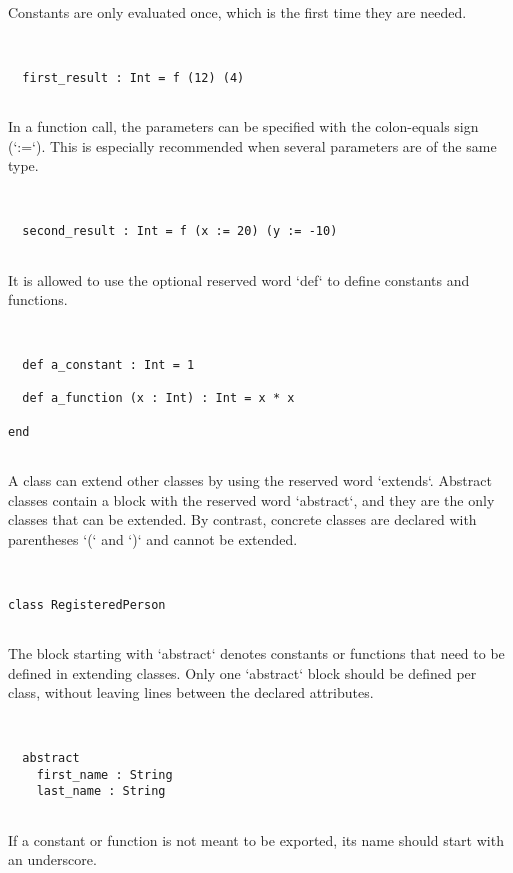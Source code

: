 \documentclass[12pt,a4paper]{article}
\begin{document}
  Constants are only evaluated once, which is the first time they are needed.


\begin{lstlisting}


  first_result : Int = f (12) (4)


\end{lstlisting}

  In a function call, the parameters can be specified with the colon-equals sign (`:=`).
   This is especially recommended when several parameters are of the same type.


\begin{lstlisting}


  second_result : Int = f (x := 20) (y := -10)


\end{lstlisting}

  It is allowed to use the optional reserved word `def` to define constants and functions.


\begin{lstlisting}


  def a_constant : Int = 1

  def a_function (x : Int) : Int = x * x

end


\end{lstlisting}

A class can extend other classes by using the reserved word `extends`.
 Abstract classes contain a block with the reserved word `abstract`, and they are the only
 classes that can be extended.
 By contrast, concrete classes are declared with parentheses `(` and `)` and cannot be
 extended.


\begin{lstlisting}


class RegisteredPerson


\end{lstlisting}

  The block starting with `abstract` denotes constants or functions that need to be defined
   in extending classes. Only one `abstract` block should be defined per class, without
   leaving lines between the declared attributes.


\begin{lstlisting}


  abstract
    first_name : String
    last_name : String


\end{lstlisting}

  If a constant or function is not meant to be exported, its name should start with an
   underscore.
\end{document}
